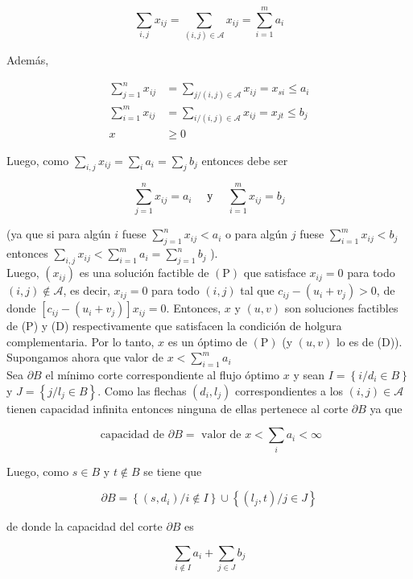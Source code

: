 \documentclass[10pt]{article}
\begin{document}
$$
\sum_{i, j} x_{i j}=\sum_{(i, j) \in \mathcal{A}} x_{i j}=\sum_{i=1}^{m} a_{i}
$$

Además,

$$
\begin{aligned}
\sum_{j=1}^{n} x_{i j} & =\sum_{j /(i, j) \in \mathcal{A}} x_{i j}=x_{s i} \leq a_{i} \\
\sum_{i=1}^{m} x_{i j} & =\sum_{i /(i, j) \in \mathcal{A}} x_{i j}=x_{j t} \leq b_{j} \\
x & \geq 0
\end{aligned}
$$

Luego, como $\sum_{i, j} x_{i j}=\sum_{i} a_{i}=\sum_{j} b_{j}$ entonces debe ser

$$
\sum_{j=1}^{n} x_{i j}=a_{i} \quad \text { у } \quad \sum_{i=1}^{m} x_{i j}=b_{j}
$$

(ya que si para algún $i$ fuese $\sum_{j=1}^{n} x_{i j}<a_{i}$ o para algún $j$ fuese $\sum_{i=1}^{m} x_{i j}<b_{j}$ entonces $\sum_{i, j} x_{i j}<\sum_{i=1}^{m} a_{i}=\sum_{j=1}^{n} b_{j}$ ).\\
Luego, $\left(x_{i j}\right)$ es una solución factible de $(\mathrm{P})$ que satisface $x_{i j}=0$ para todo $(i, j) \notin \mathcal{A}$, es decir, $x_{i j}=0$ para todo $(i, j)$ tal que $c_{i j}-\left(u_{i}+v_{j}\right)>0$, de donde $\left[c_{i j}-\left(u_{i}+v_{j}\right)\right] x_{i j}=0$. Entonces, $x$ y $(u, v)$ son soluciones factibles de (P) y (D) respectivamente que satisfacen la condición de holgura complementaria. Por lo tanto, $x$ es un óptimo de $(\mathrm{P})$ (y $(u, v)$ lo es de (D)).\\
Supongamos ahora que valor de $x<\sum_{i=1}^{m} a_{i}$\\
Sea $\partial B$ el mínimo corte correspondiente al flujo óptimo $x$ y sean $I=\left\{i / d_{i} \in B\right\}$ y $J=\left\{j / l_{j} \in B\right\}$. Como las flechas $\left(d_{i}, l_{j}\right)$ correspondientes a los $(i, j) \in \mathcal{A}$ tienen capacidad infinita entonces ninguna de ellas pertenece al corte $\partial B$ ya que

$$
\text { capacidad de } \partial B=\text { valor de } x<\sum_{i} a_{i}<\infty
$$

Luego, como $s \in B$ y $t \notin B$ se tiene que

$$
\partial B=\left\{\left(s, d_{i}\right) / i \notin I\right\} \cup\left\{\left(l_{j}, t\right) / j \in J\right\}
$$

de donde la capacidad del corte $\partial B$ es

$$
\sum_{i \notin I} a_{i}+\sum_{j \in J} b_{j}
$$
\end{document}
